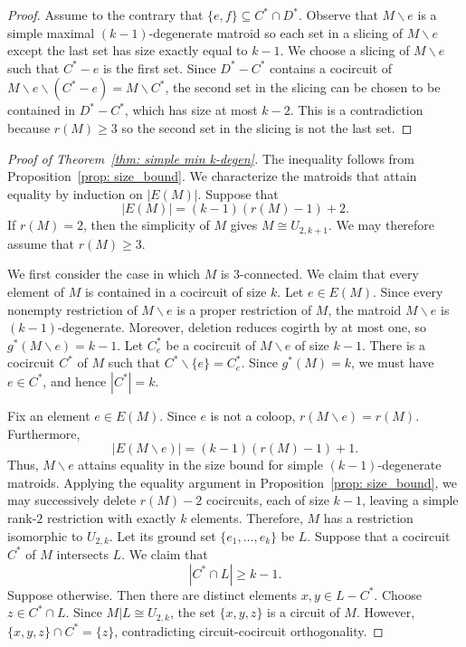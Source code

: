 \documentclass{amsart}
\newcommand{\ba}{\backslash}
\theoremstyle{definition}
\theoremstyle{remark}
\numberwithin{equation}{section}
\begin{document}
\begin{proof}
Assume to the contrary that $\{e,f\} \subseteq C^* \cap D^*$. Observe that $M\ba e$ is a simple maximal $(k-1)$-degenerate matroid so each set in a slicing of $M\ba e$ except the last set has size exactly equal to $k-1$. We choose a slicing of $M\ba e$ such that $C^*-e$ is the first set. Since $D^*-C^*$ contains a cocircuit of $M \ba e \ba (C^*-e)= M\ba C^*$, the second set in the slicing can be chosen to be contained in $D^*-C^*$, which has size at most $k-2$. This is a contradiction because $r(M) \geq 3$ so the second set in the slicing is not the last set.
\end{proof}

\begin{proof}[Proof of Theorem~\ref{thm: simple min k-degen}]
The inequality follows from Proposition~\ref{prop: size_bound}. We characterize the matroids that attain equality by induction on $|E(M)|$. Suppose that
\[
    |E(M)|=(k-1)(r(M)-1)+2.
\]
If $r(M)=2$, then the simplicity of $M$ gives $M\cong U_{2,k+1}$. We may therefore assume that $r(M)\geq 3$.

We first consider the case in which $M$ is $3$-connected. We claim that every element of $M$ is contained in a cocircuit of size $k$. Let $e\in E(M)$. Since every nonempty restriction of $M\ba e$ is a proper restriction of $M$, the matroid $M\ba e$ is $(k-1)$-degenerate. Moreover, deletion reduces cogirth by at most one, so $g^*(M\ba e)=k-1$. Let $C_e^*$ be a cocircuit of $M\ba e$ of size $k-1$. There is a cocircuit $C^*$ of $M$ such that $C^*\backslash\{e\}=C_e^*$. Since $g^*(M)=k$, we must have $e\in C^*$, and hence $|C^*|=k$.

Fix an element $e\in E(M)$. Since $e$ is not a coloop, $r(M\ba e)=r(M)$. Furthermore,
\[
    |E(M\ba e)|=(k-1)(r(M)-1)+1.
\]
Thus, $M\ba e$ attains equality in the size bound for simple $(k-1)$-degenerate matroids. Applying the equality argument in Proposition~\ref{prop: size_bound}, we may successively delete $r(M)-2$ cocircuits, each of size $k-1$, leaving a simple rank-$2$ restriction with exactly $k$ elements. Therefore, $M$ has a restriction isomorphic to $U_{2,k}$. Let its ground set $\{e_1,\ldots,e_k\}$ be $L$. Suppose that a cocircuit $C^*$ of $M$ intersects $L$. We claim that
\[
    |C^*\cap L|\geq k-1.
\]
Suppose otherwise. Then there are distinct elements $x,y\in L-C^*$. Choose $z\in C^*\cap L$. Since $M|L\cong U_{2,k}$, the set $\{x,y,z\}$ is a circuit of $M$. However, $\{x,y,z\}\cap C^*=\{z\}$, contradicting circuit-cocircuit orthogonality.


\end{proof}
\end{document}
